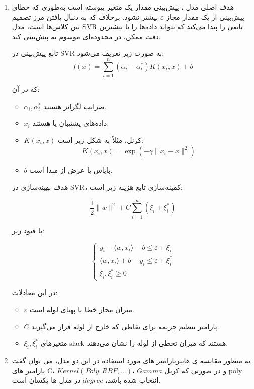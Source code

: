 \documentclass{article}
\begin{document}
\begin{enumerate}
	\item 
هدف اصلی مدل ، پیش‌بینی مقدار یک متغیر پیوسته است به‌طوری که خطای پیش‌بینی از یک مقدار مجاز $\varepsilon$ بیشتر نشود. برخلاف  که به دنبال یافتن مرز تصمیم بین کلاس‌ها است، مدل SVR تابعی را پیدا می‌کند که بتواند داده‌ها را با بیشترین دقت ممکن، در محدوده‌ای موسوم به  پیش‌بینی کند.


تابع پیش‌بینی در SVR به صورت زیر تعریف می‌شود:
\[
f(x) = \sum_{i=1}^n (\alpha_i - \alpha_i^*) K(x_i, x) + b
\]

که در آن:

\begin{itemize}
	\item $\alpha_i, \alpha_i^*$ ضرایب لگرانژ هستند.
	\item $x_i$ داده‌های پشتیبان یا  هستند.
	\item $K(x_i, x)$ کرنل، مثلاً  به شکل زیر است:
	\[
	K(x_i, x) = \exp\left(-\gamma \|x_i - x\|^2\right)
	\]
	\item $b$ بایاس یا عرض از مبدأ است.
\end{itemize}

هدف بهینه‌سازی در SVR، کمینه‌سازی تابع هزینه زیر است:

\[
\frac{1}{2} \|w\|^2 + C \sum_{i=1}^n (\xi_i + \xi_i^*)
\]

با قیود زیر:

\[
\begin{cases}
	y_i - \langle w, x_i \rangle - b \leq \varepsilon + \xi_i \\
	\langle w, x_i \rangle + b - y_i \leq \varepsilon + \xi_i^* \\
	\xi_i, \xi_i^* \geq 0
\end{cases}
\]

در این معادلات:

\begin{itemize}
	\item $\varepsilon$ میزان مجاز خطا یا پهنای لوله است.
	\item $C$ پارامتر تنظیم جریمه برای نقاطی که خارج از لوله قرار می‌گیرند.
	\item $\xi_i, \xi_i^*$ متغیرهای slack هستند که میزان تخطی از لوله را نشان می‌دهند.
\end{itemize}

\item
به منظور مقایسه ی هایپرپارامتر های مورد استفاده در این دو مدل، می توان گفت پارامتر های C،
$Kernel(Poly, RBF,...)$،
$Gamma$ و در صورتی که کرنل poly انتخاب شده باشد، $degree$ در مدل ها یکسان است.


\end{enumerate}
\end{document}
